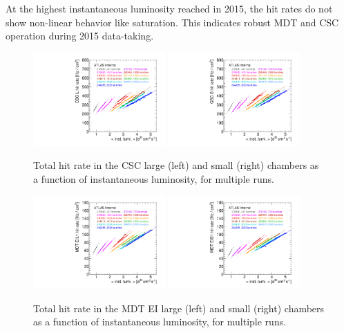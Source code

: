 At the highest instantaneous luminosity reached in 2015, the hit rates do not show non-linear behavior like saturation. This indicates robust MDT and CSC operation during 2015 data-taking.

\begin{figure}
  \begin{center}
    \includegraphics[width=0.45\textwidth]{./figures/rate_raw_vs_lumi_vs_evts_csc_CSL1_overlay.pdf}
    \includegraphics[width=0.45\textwidth]{./figures/rate_raw_vs_lumi_vs_evts_csc_CSS1_overlay.pdf}
    \caption{Total hit rate in the CSC large (left) and small (right) chambers as a function of instantaneous luminosity, for multiple runs.}
    \label{fig:hitrates-vs-lumi-csc-raw}
  \end{center}
\end{figure}

\begin{figure}
  \begin{center}
    \includegraphics[width=0.45\textwidth]{./figures/rate_raw_vs_lumi_vs_evts_mdt_EIL1_overlay.pdf}
    \includegraphics[width=0.45\textwidth]{./figures/rate_raw_vs_lumi_vs_evts_mdt_EIS1_overlay.pdf}
    \caption{Total hit rate in the MDT EI large (left) and small (right) chambers as a function of instantaneous luminosity, for multiple runs.}
    \label{fig:hitrates-vs-lumi-mdt-ei1-raw}
  \end{center}
\end{figure}

